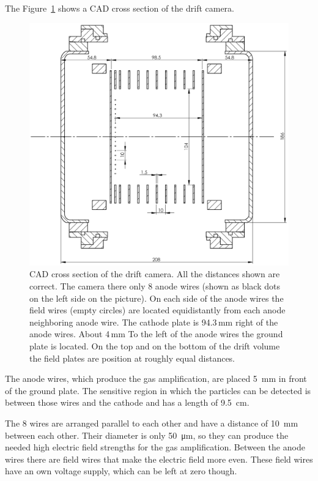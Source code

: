\documentclass[12pt]{article}
\begin{document}
 The Figure~\ref{fig:drift_camera_cross_section} shows a CAD cross section of the drift camera.

\begin{figure}[!h]
	\includegraphics[width=13cm]{pics/Driftkammer_Schnittbild.jpg}
	\centering
	\caption{CAD cross section of the drift camera. All the distances shown are correct. The camera there only 8 anode wires (shown as black dots on the left side on the picture). On each side of the anode wires the field wires (empty circles) are located equidistantly from each anode neighboring anode wire. The cathode plate is 94.3\,mm right of the anode wires. About 4\,mm To the left of the anode wires the ground plate is located. On the top and on the bottom of the drift volume the field plates are position at roughly equal distances.}
	\label{fig:drift_camera_cross_section}
\end{figure}

The anode wires, which produce the gas amplification, are placed \SI{5}{\milli\meter} in front of the ground plate. The sensitive region in which the particles can be detected is between those wires and the cathode and has a length of \SI{9.5}{\centi\meter}.

The 8 wires are arranged parallel to each other and  have a distance of \SI{10}{\milli\meter} between each other. Their diameter is only \SI{50}{\micro\meter}, so they can produce the needed high electric field strengths for the gas amplification. Between the anode wires there are field wires that make the electric field more even. These field wires have an own voltage supply, which can be left at zero though. 
\end{document}
